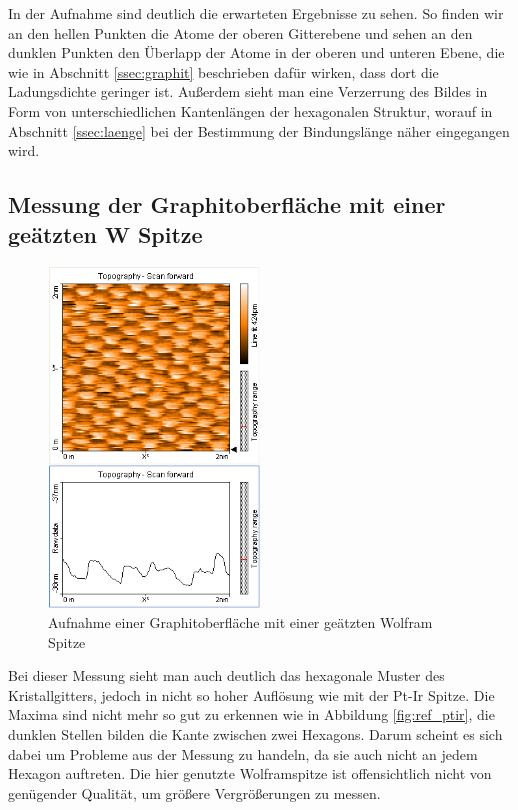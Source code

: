 \documentclass[10pt, a4paper]{article}
\begin{document}
In der Aufnahme sind deutlich die erwarteten Ergebnisse zu sehen.
So finden wir an den hellen Punkten die Atome der oberen Gitterebene und sehen an den dunklen Punkten den Überlapp der Atome in der oberen und unteren Ebene, die wie in Abschnitt \ref{ssec:graphit} beschrieben dafür wirken, dass dort die Ladungsdichte geringer ist.
Außerdem sieht man eine Verzerrung des Bildes in Form von unterschiedlichen Kantenlängen der hexagonalen Struktur, worauf in Abschnitt \ref{ssec:laenge} bei der Bestimmung der Bindungslänge näher eingegangen wird.

\subsection{Messung der Graphitoberfläche mit einer geätzten W Spitze}
\begin{figure}[!h]
\centering
\includegraphics[width=0.5\textwidth]{./grafiken/originale/ref_graphit_w_2nm.png}
\caption{Aufnahme einer Graphitoberfläche mit einer geätzten Wolfram Spitze}
\label{fig:ref_w}
\end{figure}

Bei dieser Messung sieht man auch deutlich das hexagonale Muster des Kristallgitters, jedoch in nicht so hoher Auflösung wie mit der Pt-Ir Spitze.
Die Maxima sind nicht mehr so gut zu erkennen wie in Abbildung \ref{fig:ref_ptir}, die dunklen Stellen bilden die Kante zwischen zwei Hexagons.
Darum scheint es sich dabei um Probleme aus der Messung zu handeln, da sie auch nicht an jedem Hexagon auftreten.
Die hier genutzte Wolframspitze ist offensichtlich nicht von genügender Qualität, um größere Vergrößerungen zu messen.
\end{document}
